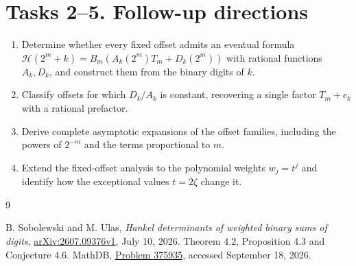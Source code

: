 \documentclass[11pt]{article}
\newcommand{\HH}{\mathcal H}
\begin{document}
\section*{Tasks 2--5. Follow-up directions}
\begin{enumerate}[start=2,leftmargin=*]
\item Determine whether every fixed offset admits an eventual formula
$\HH(2^m+k)=B_m(A_k(2^m)T_m+D_k(2^m))$ with rational functions
$A_k,D_k$, and construct them from the binary digits of $k$.
\item Classify offsets for which $D_k/A_k$ is constant, recovering a
single factor $T_m+c_k$ with a rational prefactor.
\item Derive complete asymptotic expansions of the offset families,
including the powers of $2^{-m}$ and the terms proportional to $m$.
\item Extend the fixed-offset analysis to the polynomial weights $w_j=t^j$
and identify how the exceptional values $t=2\zeta$ change it.
\end{enumerate}

\begin{thebibliography}{9}
\raggedright
{} B. Sobolewski and M. Ulas,
\emph{Hankel determinants of weighted binary sums of digits},
\href{https://arxiv.org/abs/2607.09376v1}{arXiv:2607.09376v1}, July 10, 2026.
Theorem 4.2, Proposition 4.3 and Conjecture 4.6.
 MathDB,
\href{https://mathdb.com/p/375935}{Problem 375935}, accessed September 18, 2026.
\end{thebibliography}
\end{document}
